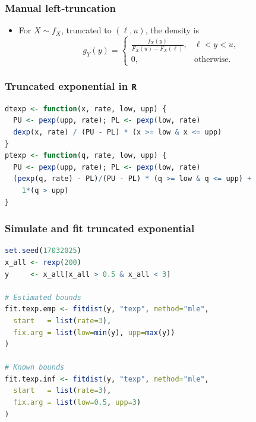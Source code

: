 \documentclass{article}
\begin{document}
\subsubsection{Manual left‐truncation}
\begin{itemize}
  \item For $X\sim f_X$, truncated to $(\ell,u)$, the density is
    \begin{equation*}
      g_Y(y)
      = \begin{cases}
        \displaystyle
        \frac{f_X(y)}{F_X(u) - F_X(\ell)}, & \ell < y < u,\\[0.5em]
        0, & \text{otherwise}.
      \end{cases}
    \end{equation*}
\end{itemize}

\subsubsection{Truncated exponential in \texttt{R}}
\begin{lstlisting}[language=R]
dtexp <- function(x, rate, low, upp) {
  PU <- pexp(upp, rate); PL <- pexp(low, rate)
  dexp(x, rate) / (PU - PL) * (x >= low & x <= upp)
}
ptexp <- function(q, rate, low, upp) {
  PU <- pexp(upp, rate); PL <- pexp(low, rate)
  (pexp(q, rate) - PL)/(PU - PL) * (q >= low & q <= upp) +
    1*(q > upp)
}
\end{lstlisting}

\subsubsection{Simulate and fit truncated exponential}
\begin{lstlisting}[language=R]
set.seed(17032025)
x_all <- rexp(200)
y     <- x_all[x_all > 0.5 & x_all < 3]

# Estimated bounds
fit.texp.emp <- fitdist(y, "texp", method="mle",
  start   = list(rate=3),
  fix.arg = list(low=min(y), upp=max(y))
)

# Known bounds
fit.texp.inf <- fitdist(y, "texp", method="mle",
  start   = list(rate=3),
  fix.arg = list(low=0.5, upp=3)
)
\end{lstlisting}
\end{document}
